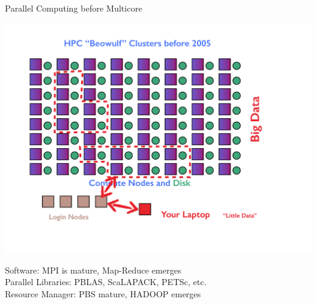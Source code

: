 \begin{frame}{Parallel Computing before Multicore}
\begin{minipage}{8.0cm}
  \includegraphics[trim=3cm 0cm 0cm 0cm,clip=true,height=0.9\textheight]
  {../common/pics/hardware/ParallelHardware22.pdf}\hfill
\end{minipage}
\hspace{1ex}
\begin{minipage}{3.6cm}\small
  \begin{block}{Software:}\pause
    \scriptsize MPI is mature, Map-Reduce emerges \\[1ex]
    Parallel Libraries: PBLAS, ScaLAPACK, PETSc, etc. \\[1ex]
    Resource Manager: PBS mature, HADOOP emerges
  \end{block}
\end{minipage}
\end{frame}

